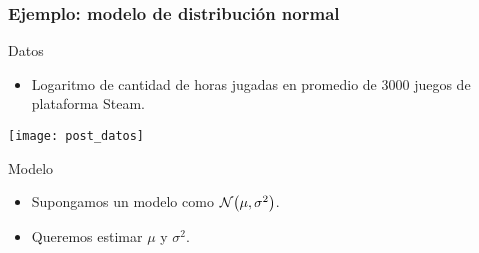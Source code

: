 \documentclass[table]{beamer}
\begin{document}
\begin{frame}
    \frametitle{Ejemplo: modelo de distribución normal}
    \begin{block}{Datos}
        \begin{itemize}
            \item Logaritmo de cantidad de horas jugadas en promedio de $3000$ juegos de plataforma Steam.
        \end{itemize}
    \end{block}
    \begin{center}
        \texttt{[image: post\_datos]}
    \end{center}
    \begin{block}{Modelo}
        \begin{itemize}
            \item Supongamos un modelo como $\normal{\mu}{\sigma^{2}}$.
            \item Queremos estimar $\mu$ y $\sigma^{2}$.
        \end{itemize}
    \end{block}
\end{frame}

\iffalse
\begin{frame}
    \frametitle{Ejemplo: modelo de distribución normal}
    \begin{block}{Modelo}
        \begin{itemize}
            \item Supongamos un modelo como $\normal{\mu}{\sigma^{2}}$.
            \item Queremos estimar $\mu$ y $\sigma^{2}$.
        \end{itemize}
    \end{block}
    \begin{center}
        \texttt{[image: post\_datos]}
    \end{center}
    \begin{block}{Distribución conjunta de $\mu$ y $\sigma^{2}$}
        \begin{equation*}
            \pdf{\mu , \sigma^{2} \mid \Xvec_{n}} = \frac{\pdf{\Xvec_{n} \mid \mu , \sigma^{2}} \pdf{\mu , \sigma^{2}}}{\pdf{\Xvec_{n}}} .
        \end{equation*}
    \end{block}
\end{frame}
\fi
\end{document}
